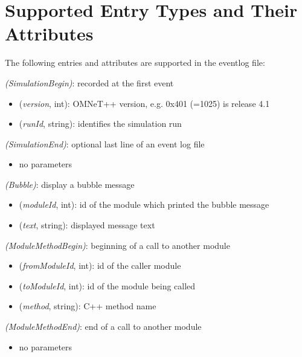 \section{Supported Entry Types and Their Attributes}

The following entries and attributes are supported in the eventlog file:


 \textit{(SimulationBegin)}: recorded at the first event

\begin{itemize}
  \item {} (\textit{version}, int): OMNeT++ version, e.g. 0x401 (=1025) is release 4.1
  \item {} (\textit{runId}, string): identifies the simulation run
\end{itemize}

 \textit{(SimulationEnd)}: optional last line of an event log file

\begin{itemize}
  \item no parameters
\end{itemize}

 \textit{(Bubble)}: display a bubble message

\begin{itemize}
  \item {} (\textit{moduleId}, int): id of the module which printed the bubble message
  \item {} (\textit{text}, string): displayed message text
\end{itemize}

 \textit{(ModuleMethodBegin)}: beginning of a call to another module

\begin{itemize}
  \item {} (\textit{fromModuleId}, int): id of the caller module
  \item {} (\textit{toModuleId}, int): id of the module being called
  \item {} (\textit{method}, string): C++ method name
\end{itemize}

 \textit{(ModuleMethodEnd)}: end of a call to another module

\begin{itemize}
  \item no parameters
\end{itemize}

